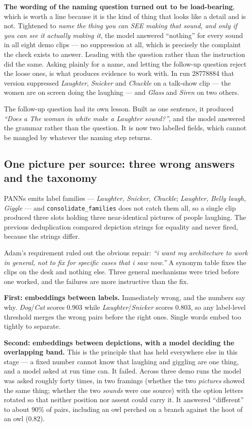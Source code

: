 \documentclass[11pt,a4paper]{article}
\begin{document}
\textbf{The wording of the naming question turned out to be load-bearing}, which is worth a line
because it is the kind of thing that looks like a detail and is not. Tightened to \emph{name the thing
you can SEE making that sound, and only if you can see it actually making it}, the model answered
``nothing'' for every sound in all eight demo clips --- no suppression at all, which is precisely the
complaint the check exists to answer. Leading with the question rather than the instruction did the
same. Asking plainly for a name, and letting the follow-up question reject the loose ones, is what
produces evidence to work with. In run 28778884 that version suppressed \emph{Laughter},
\emph{Snicker} and \emph{Chuckle} on a talk-show clip --- the women are on screen doing the laughing
--- and \emph{Glass} and \emph{Siren} on two others.

The follow-up question had its own lesson. Built as one sentence, it produced \emph{``Does a The woman
in white make a Laughter sound?''}, and the model answered the grammar rather than the question. It is
now two labelled fields, which cannot be mangled by whatever the naming step returns.

\subsection{One picture per source: three wrong answers and the taxonomy}\label{sec:dedup}
PANNs emits label families --- \emph{Laughter, Snicker, Chuckle}; \emph{Laughter, Belly laugh,
Giggle} --- and \texttt{consolidate\_families} does not catch them all, so a single clip produced
three slots holding three near-identical pictures of people laughing. The previous deduplication
compared depiction strings for equality and never fired, because the strings differ.

Adam's requirement ruled out the obvious repair: \emph{``i want my architecture to work in general,
not to fix for specific cases that i saw now.''} A synonym table fixes the clips on the desk and
nothing else. Three general mechanisms were tried before one worked, and the failures are more
instructive than the fix.

\textbf{First: embeddings between labels.} Immediately wrong, and the numbers say why.
\emph{Dog}/\emph{Cat} scores 0.903 while \emph{Laughter}/\emph{Snicker} scores 0.803, so any
label-level threshold merges the wrong pairs before the right ones. Single words embed too tightly to
separate.

\textbf{Second: embeddings between depictions, with a model deciding the overlapping band.} This is
the principle that has held everywhere else in this stage --- a fixed number cannot know that
laughing and giggling are one thing, and a model asked at run time can. It failed. Across three demo
runs the model was asked roughly forty times, in two framings (whether the two \emph{pictures} showed
the same thing; whether the two \emph{sounds} were one source) with the option letters rotated so
that neither position nor assent could carry it. It answered ``different'' to about 90\% of pairs,
including an owl perched on a branch against the hoot of an owl (0.82).
\end{document}
